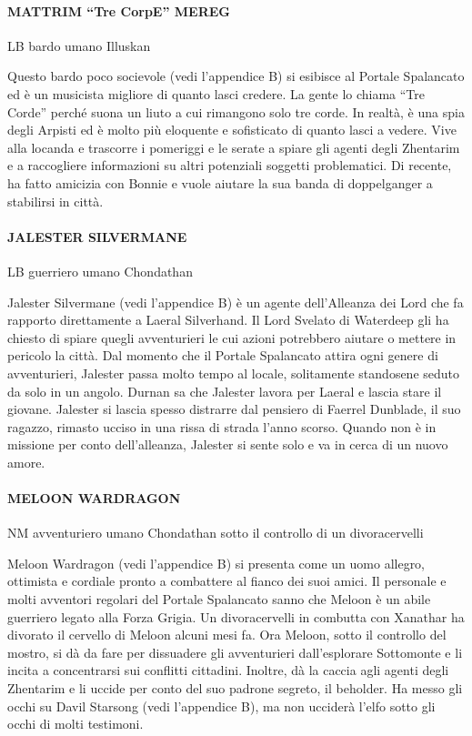 \documentclass{article}
\begin{document}
                \paragraph{MATTRIM “Tre CorpE” MEREG}
LB bardo umano Illuskan

Questo bardo poco socievole (vedi l'appendice B) si esibisce al Portale Spalancato ed è un musicista migliore di quanto lasci credere. La gente lo chiama “Tre Corde” perché suona un liuto a cui rimangono solo tre corde. In realtà, è una spia degli Arpisti ed è molto più eloquente e sofisticato di quanto lasci a vedere. Vive alla locanda e trascorre i pomeriggi e le serate a spiare gli agenti degli Zhentarim e a raccogliere informazioni su altri potenziali soggetti problematici. Di recente, ha fatto amicizia con Bonnie e vuole aiutare la sua banda di doppelganger a stabilirsi in città.

                \paragraph{JALESTER SILVERMANE}
LB guerriero umano Chondathan

Jalester Silvermane (vedi l'appendice B) è un agente dell'Alleanza dei Lord che fa rapporto direttamente a Laeral Silverhand. Il Lord Svelato di Waterdeep gli ha chiesto di spiare quegli avventurieri le cui azioni potrebbero aiutare o mettere in pericolo la città. Dal momento che il Portale Spalancato attira ogni genere di avventurieri, Jalester passa molto tempo al locale, solitamente standosene seduto da solo in un angolo. Durnan sa che Jalester lavora per Laeral e lascia stare il giovane. Jalester si lascia spesso distrarre dal pensiero di Faerrel Dunblade, il suo ragazzo, rimasto ucciso in una rissa di strada l’anno scorso. Quando non è in missione per conto dell'alleanza, Jalester si sente solo e va in cerca di un nuovo amore.

                \paragraph{MELOON WARDRAGON}
NM avventuriero umano Chondathan sotto il controllo di un divoracervelli

Meloon Wardragon (vedi l'appendice B) si presenta come un uomo allegro, ottimista e cordiale pronto a combattere al fianco dei suoi amici. Il personale e molti avventori regolari del Portale Spalancato sanno che Meloon è un abile guerriero legato alla Forza Grigia. Un divoracervelli in combutta con Xanathar ha divorato il cervello di Meloon alcuni mesi fa. Ora Meloon, sotto il controllo del mostro, si dà da fare per dissuadere gli avventurieri dall'esplorare Sottomonte e li incita a concentrarsi sui conflitti cittadini. Inoltre, dà la caccia agli agenti degli Zhentarim e li uccide per conto del suo padrone segreto, il beholder. Ha messo gli occhi su Davil Starsong (vedi l'appendice B), ma non ucciderà l’elfo sotto gli occhi di molti testimoni.
\end{document}
